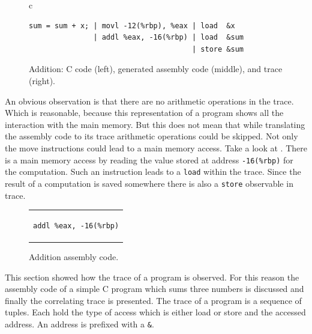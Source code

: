 \documentclass[onecolumn, openright, master, english, signatures]{dbrgrptt}
\begin{document}
\begin{figure}[!ht]
  \centering
  \begin{tabular}{c}
  \begin{lstlisting}
sum = sum + x; | movl -12(%rbp), %eax | load  &x
               | addl %eax, -16(%rbp) | load  &sum
                                      | store &sum
  \end{lstlisting}
  \end{tabular}
  \caption{Addition: C code (left), generated assembly code (middle), and \ac{trace} (right).}
  \label{fig:mat-example-comp-addition-all}
\end{figure}

An obvious observation is that there are no arithmetic operations in the \ac{trace}. Which is reasonable, because this representation of a program shows all the interaction with the main memory. But this does not mean that while translating the assembly code to its \ac{trace} arithmetic operations could be skipped. Not only the move instructions could lead to a main memory access. Take a look at . There is a main memory access by reading the value stored at address \texttt{-16(\%rbp)} for the computation. Such an instruction leads to a \texttt{load} within the \ac{trace}. Since the result of a computation is saved somewhere there is also a \texttt{store} observable in \ac{trace}.

\begin{figure}[!ht]
  \centering
  \begin{tabular}{c}
  \begin{lstlisting}
addl %eax, -16(%rbp)
  \end{lstlisting}
  \end{tabular}
  \caption{Addition assembly code.}
  \label{fig:mat-example-addition-detail}
\end{figure}

This section showed how the \ac{trace} of a program is observed. For this reason the assembly code of a simple C program which sums three numbers is discussed and finally the correlating \ac{trace} is presented. The \ac{trace} of a program is a sequence of tuples. Each hold the type of access which is either load or store and the accessed address. An address is prefixed with a \texttt{\&}.

\end{document}
